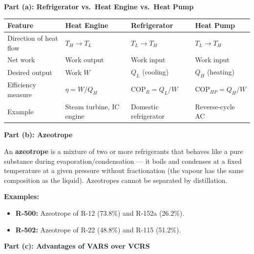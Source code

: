 \documentclass[12pt,a3paper]{article}
\begin{document}
\begin{enumerate}
\begin{tcolorbox}[enhanced,breakable,ansbox,colback=cC!4,colframe=cC,
  boxrule=0.8pt,arc=5pt,
  title={\textbf{Answer}},fonttitle=\bfseries\color{white},colbacktitle=cC]
\textbf{Part (a): Refrigerator vs.\ Heat Engine vs.\ Heat Pump}

\begin{center}
\small
\begin{tabularx}{\linewidth}{@{}llXl@{}}
\toprule
\textbf{Feature}        & \textbf{Heat Engine}       & \textbf{Refrigerator}      & \textbf{Heat Pump} \\
\midrule
Direction of heat flow  & $T_H \to T_L$              & $T_L \to T_H$              & $T_L \to T_H$ \\
Net work                & Work output                & Work input                 & Work input \\
Desired output          & Work $W$                   & $Q_L$ (cooling)            & $Q_H$ (heating) \\
Efficiency measure      & $\eta = W/Q_H$             & $\text{COP}_R = Q_L/W$     & $\text{COP}_{HP} = Q_H/W$ \\
Example                 & Steam turbine, IC engine   & Domestic refrigerator      & Reverse-cycle AC \\
\bottomrule
\end{tabularx}
\end{center}

\hrulefill

\textbf{Part (b): Azeotrope}

An \textbf{azeotrope} is a mixture of two or more refrigerants that behaves
like a pure substance during evaporation/condensation — it boils and
condenses at a fixed temperature at a given pressure without fractionation
(the vapour has the same composition as the liquid). Azeotropes cannot be
separated by distillation.

\textbf{Examples:}
\begin{itemize}[leftmargin=1.5em,itemsep=1pt]
  \item \textbf{R-500:} Azeotrope of R-12 (73.8\%) and R-152a (26.2\%).
  \item \textbf{R-502:} Azeotrope of R-22 (48.8\%) and R-115 (51.2\%).
\end{itemize}

\hrulefill

\textbf{Part (c): Advantages of VARS over VCRS}


\end{tcolorbox}
\end{enumerate}
\end{document}
